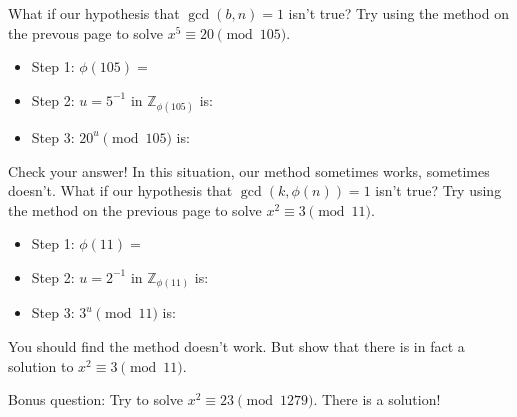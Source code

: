 \documentclass[12pt]{exam}
\newcommand{\Z}{\mathbb Z}
\begin{document}
\begin{questions}
  \newpage
  \question What if our hypothesis that $\gcd(b,n)=1$ isn't true? Try using the method on the prevous page to solve $x^5\equiv 20\pmod{105}$.
  \begin{itemize}
    \item Step 1: $\phi(105)=$
    \vspace{1cm}
    \item Step 2: $u=5^{-1}$ in $\Z_{\phi(105)}$ is:
    \vspace{1cm}
    \item Step 3: $20^{u}\pmod{105}$ is:
    \vspace{1cm}
  \end{itemize}
  Check your answer! In this situation, our method sometimes works, sometimes doesn't.
  \question What if our hypothesis that $\gcd(k,\phi(n))=1$ isn't true? Try using the method on the previous page to solve $x^2\equiv3\pmod{11}$.
  \begin{itemize}
    \item Step 1: $\phi(11)=$
    \vspace{1cm}
    \item Step 2: $u=2^{-1}$ in $\Z_{\phi(11)}$ is:
    \vspace{1cm}
    \item Step 3: $3^{u}\pmod{11}$ is:
    \vspace{1cm}
  \end{itemize}
  You should find the method doesn't work. But show that there is in fact a solution to $x^2\equiv3\pmod{11}$.
  \vspace{2cm}
  
  Bonus question: Try to solve $x^2\equiv23\pmod{1279}$. There is a solution!
\end{questions}
\end{document}
